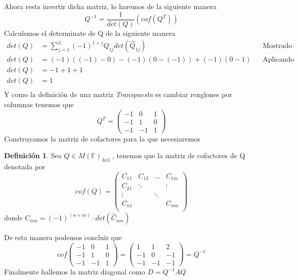 \documentclass[letterpaper]{article}
\newcommand{\F}{\mathds{F}}
\renewcommand{\*}{\cdot}
\theoremstyle{definition}
\newtheorem{definition}{Definición}
\begin{document}
Ahora resta invertir dicha matriz, lo haremos de la siguiente manera 
$$Q^{-1}= \dfrac{1}{det(Q)}(cof(Q^{T}))$$ Calculemos el determinate de Q de la siguiente manera 
\begin{align*}
	det(Q) &= \sum_{j = 1}^{3}(-1)^{1+j} Q_{1j}det(\hat{Q}_{1j}) && \text{Mostrado en clase}\\
	det(Q) &= (-1)((-1)-0)-(-1)(0-(-1)) + (-1)(0-1) && \text{Aplicando dicha definición}\\
	det(Q) &= -1+1+1\\
	det(Q) &= 1\\
\end{align*}
Y como la definición de una matriz \textit{Transpuesta} es cambiar renglones por columnas tenemos que \[ Q^T = \begin{pmatrix}
	-1 & 0 & 1\\
	-1 & 1 & 0\\
	-1 & -1 & 1
\end{pmatrix} \]
Construyamos la matriz de cofactores para la que necesiaremos 
\begin{definition}
	Sea $ Q \in M(\F)_{3x3} $ , tenemos que la matriz de cofactores de Q denotada por  $$ cof(Q) = \begin{pmatrix}
		C_{11} & C_{12} & \dots & C_{1m}\\
		C_{21} &   \ddots & & \vdots\\
		\vdots &    & \ddots & \\
		C_{n1} &    & & C_{nm}\\
	\end{pmatrix} $$ donde $ C_{nm} = (-1)^{(n+m)} \* det(\hat{C}_{nm}) $
\end{definition}
De esta manera podemos concluir que $$ cof\begin{pmatrix}
-1 & 0 & 1\\
-1 & 1 & 0\\
-1 & -1 & 1
\end{pmatrix} = \begin{pmatrix}
1 & 1 & 2\\
-1 & 0 & -1\\
-1 & -1 & -1
\end{pmatrix} = Q^{-1} $$ Finalmente hallemos la matriz diagonal como $ D = Q^{-1}AQ $
\end{document}
